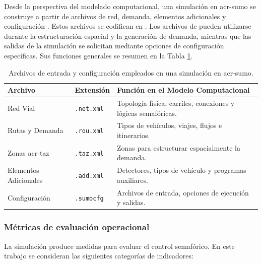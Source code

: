 Desde la perspectiva del modelado computacional, una simulación en \acrshort{acr-sumo} se construye a partir de archivos de red, demanda, elementos adicionales y configuración \cite{SUMO2026_SUMO}. Estos archivos se codifican en . Los archivos de  pueden utilizarse durante la estructuración espacial y la generación de demanda, mientras que las salidas de la simulación se solicitan mediante opciones de configuración específicas. Sus funciones generales se resumen en la Tabla \ref{tab:sumo_input_files}.

\begin{table}[!htbp]
\centering
\caption{Archivos de entrada y configuración empleados en una simulación en \acrshort{acr-sumo}.}
\label{tab:sumo_input_files}
\setlength{\tabcolsep}{4pt}
\small
\begin{tabular}{|>{\raggedright\arraybackslash}p{3.0cm}|>{\raggedright\arraybackslash}p{2.5cm}|>{\raggedright\arraybackslash}p{8.5cm}|}
\hline
\textbf{Archivo} & \textbf{Extensión} & \textbf{Función en el Modelo Computacional} \\ \hline
Red Vial & \texttt{.net.xml} & Topología física, carriles, conexiones y lógicas semafóricas. \\ \hline
Rutas y Demanda & \texttt{.rou.xml} & Tipos de vehículos, viajes, flujos e itinerarios. \\ \hline
Zonas \acrshort{acr-taz} & \texttt{.taz.xml} & Zonas para estructurar espacialmente la demanda. \\ \hline
Elementos Adicionales & \texttt{.add.xml} & Detectores, tipos de vehículo y programas auxiliares. \\ \hline
Configuración & \texttt{.sumocfg} & Archivos de entrada, opciones de ejecución y salidas. \\ \hline
\end{tabular}
\end{table}

\subsubsection{Métricas de evaluación operacional}

La simulación produce medidas para evaluar el control semafórico. En este trabajo se consideran las siguientes categorías de indicadores:


